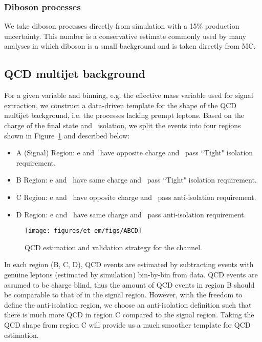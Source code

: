 \subsubsection{Diboson processes}
We take diboson processes directly from simulation with a 15\% production uncertainty. This number is a conservative estimate commonly used by many analyses in which diboson is a small background and is taken directly from MC.

    
\subsection{QCD multijet background}\label{sec:etau_qcd}
For a given variable and binning, e.g. the effective mass variable
used for signal extraction, we construct a data-driven template for
the shape of the QCD multijet background, i.e. the processes lacking
prompt leptons.  Based on the charge of the final state and \tauh ~isolation,
we split the events into four regions shown in Figure~\ref{fig:ABCD} and 
described below:
\begin{itemize}
  \item A (Signal) Region: e and \tauh ~have opposite charge and \tauh ~pass ``Tight" isolation requirement.
  \item B Region: e and \tauh ~have same charge and ~\tauh pass ``Tight" isolation requirement.
  \item C Region: e and \tauh ~have opposite charge and \tauh ~pass anti-isolation requirement.
  \item D Region: e and \tauh ~have same charge and \tauh ~pass anti-isolation requirement.
\end{itemize}

\begin{figure}[thbp!]\centering
  \texttt{[image: figures/et-em/figs/ABCD]}
  \caption{\label{fig:ABCD} QCD estimation and validation strategy for the \teth channel.}
\end{figure}
In each region (B, C, D), QCD events are estimated by subtracting events
with genuine leptons (estimated by simulation) bin-by-bin from data.
QCD events are assumed to be charge blind, thus the amount of QCD events in region B should be 
comparable to that of in the signal region. However, with the freedom to define the
anti-isolation region, we choose an anti-isolation definition such
that there is much more QCD in region C compared to the signal region. 
Taking the QCD shape from region C will provide us 
a much smoother template for QCD estimation.

